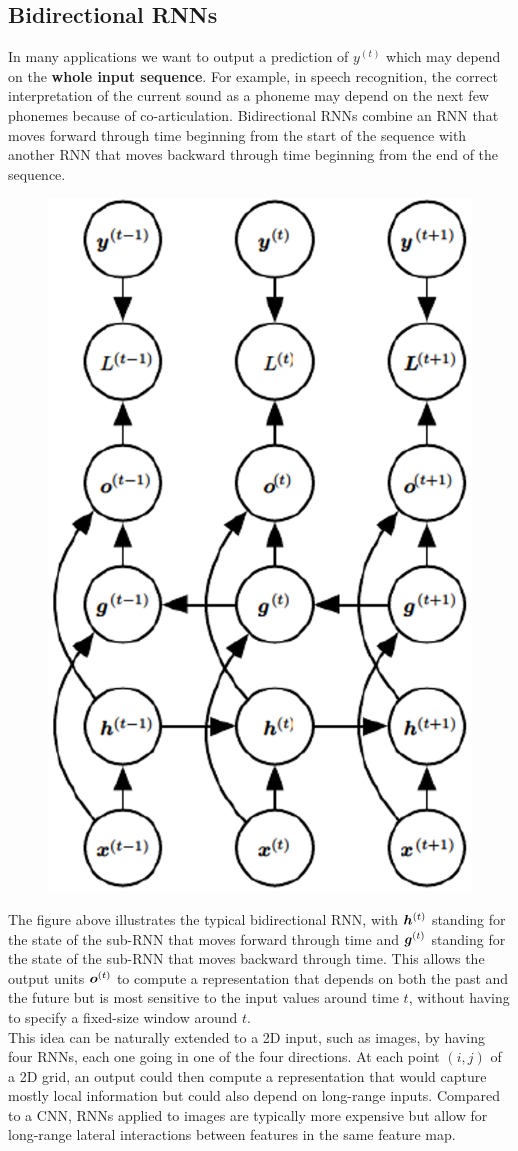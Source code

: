 \begin{multicols}{2}
	\subsection{Bidirectional RNNs}
	In many applications we want to output a prediction of $y^{(t)}$ which may depend on the \textbf{whole input sequence}.
	For example, in speech recognition, the correct interpretation of the current sound as a phoneme may depend on the next few phonemes because of co-articulation.
	Bidirectional RNNs combine an RNN that moves forward through time beginning from the start of the sequence with another RNN that moves backward through time beginning from the end of the sequence.
	\begin{figure}[H]
		\centering
		\includegraphics[width=0.4\linewidth]{images/bidir.PNG}
	\end{figure}
	The figure above illustrates the typical bidirectional RNN, with ${\bm{h}}^{(t)}$ standing for the state of the sub-RNN that moves forward through time and ${\bm{g}}^{(t)}$ standing for the state of the sub-RNN that moves backward through time.
	This allows the output units ${\bm{o}}^{(t)}$ to compute a representation that depends on both the past and the future but is most sensitive to the input values around time $t$, without having to specify a fixed-size window around $t$.\\
	
	This idea can be naturally extended to a 2D input, such as images, by having four RNNs, each one going in one of the four directions.
	At each point $(i,j)$ of a 2D grid, an output could then compute a representation that would capture mostly local information but could also depend on long-range inputs.
	Compared to a CNN, RNNs applied to images are typically more expensive but allow for long-range lateral interactions between features in the same feature map.
	

\end{multicols}
